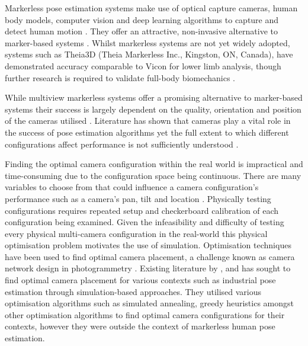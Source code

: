 Markerless pose estimation systems make use of optical capture cameras, human body models, computer vision and deep learning algorithms to capture and detect human motion \cite{colyer2018review,federolf2025validation}. They offer an attractive, non-invasive alternative to marker-based systems \cite{federolf2025validation}. Whilst markerless systems are not yet widely adopted, systems such as Theia3D (Theia Markerless Inc., Kingston, ON, Canada), have demonstrated accuracy comparable to Vicon for lower limb analysis, though further research is required to validate full-body biomechanics \cite{federolf2025validation, yang2025comparison, wren2023comparison,scataglini2024accuracy}.

While multiview markerless systems offer a promising alternative to marker-based systems their success is largely dependent on the quality, orientation and position of the cameras utilised \cite{rahimian2016optimal,jorgensen2018simulation, yang2025evaluation}.    
Literature has shown that cameras play a vital role in the success of pose estimation algorithms yet the full extent to which different configurations affect performance is not sufficiently understood \cite{kwak2025assessing}.

Finding the optimal camera configuration within the real world is impractical and time-consuming due to the configuration space being continuous. There are many variables to choose from that could influence a camera configuration's performance such as a camera's pan, tilt and location \cite{zhao2013approximate}. Physically testing configurations requires repeated setup and checkerboard calibration of each configuration being examined.
Given the infeasibility and difficulty of testing every physical multi-camera configuration in the real-world this physical optimisation problem motivates the use of simulation. Optimisation techniques have been used to find optimal camera placement, a challenge known as camera network design in photogrammetry \cite{olague2001applications}. Existing literature by \citet{zhao2013approximate}, \citet{rahimian2016optimal} and \citet{jorgensen2018simulation} has sought to find optimal camera placement for various contexts such as industrial pose estimation through simulation-based approaches. They utilised various optimisation algorithms such as simulated annealing, greedy heuristics amongst other optimisation algorithms to find optimal camera configurations for their contexts, however they were outside the context of markerless human pose estimation. 

